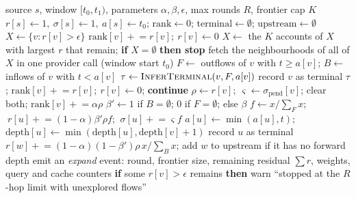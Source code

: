 \begin{algorithm}[H]
\caption{TTR-lite (ranked, time-respecting forward push)}\label{alg:ttr}
\small\singlespacing
\begin{algorithmic}[1]
\Require source $s$, window $[t_0,t_1)$, parameters $\alpha,\beta,\epsilon$, max rounds $R$, frontier cap $K$
\State $r[s]\gets 1,\ \sigma[s]\gets 1,\ a[s]\gets t_0$; $\mathrm{rank}\gets 0$; $\mathrm{terminal}\gets\emptyset$; $\mathrm{upstream}\gets\emptyset$
  \State $X \gets \{v: r[v]>\epsilon\}$
   \State $\mathrm{rank}[v]\mathrel{+}=r[v];\ r[v]\gets 0$ \EndFor
  \State $X \gets$ the $K$ accounts of $X$ with largest $r$ that remain; \textbf{if} $X=\emptyset$ \textbf{then stop}
  \State fetch the neighbourhoods of all of $X$ in one provider call (window start $t_0$)
    \State $F\gets$ outflows of $v$ with $t\ge a[v]$; $B\gets$ inflows of $v$ with $t<a[v]$ 
    \State $\tau\gets \textsc{InferTerminal}(v,F,a[v])$
    \If{$\tau\neq\bot$} \State record $v$ as terminal $\tau$; $\mathrm{rank}[v]\mathrel{+}=r[v];\ r[v]\gets 0$; \textbf{continue} \EndIf
    \State $\rho\gets r[v];\ \varsigma\gets\sigma_{\mathrm{pend}}[v]$; clear both; $\mathrm{rank}[v]\mathrel{+}=\alpha\rho$
    \State $\beta'\gets 1$ if $B=\emptyset$; $0$ if $F=\emptyset$; else $\beta$
      \State $f\gets x/\sum_F x$; $\ r[u]\mathrel{+}=(1-\alpha)\beta'\rho f$; $\ \sigma[u]\mathrel{+}=\varsigma f$
      \State $a[u]\gets\min(a[u],t)$; $\mathrm{depth}[u]\gets\min(\mathrm{depth}[u],\mathrm{depth}[v]+1)$
       \State record $u$ as terminal \EndIf
    \EndFor
      \State $r[w]\mathrel{+}=(1-\alpha)(1-\beta')\rho\, x/\sum_B x$; add $w$ to upstream if it has no forward depth
    \EndFor
  \EndFor
  \State emit an \emph{expand} event: round, frontier size, remaining residual $\sum r$, weights, query and cache counters
\EndFor
\State \textbf{if} some $r[v]>\epsilon$ remains \textbf{then} warn ``stopped at the $R$-hop limit with unexplored flows''
\end{algorithmic}
\end{algorithm}

